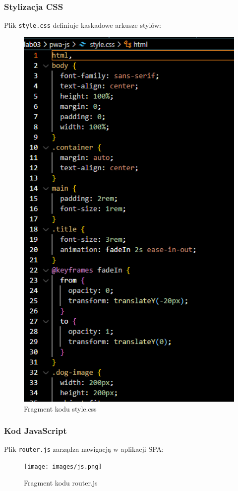 \documentclass[a4paper,12pt]{article}
\begin{document}
\subsubsection{Stylizacja CSS}
Plik \texttt{style.css} definiuje kaskadowe arkusze stylów:

\begin{figure}[H]
    \centering
    \includegraphics[width=1\textwidth]{images/css.png}
    \caption{Fragment kodu style.css}
\end{figure}

\subsubsection{Kod JavaScript}
Plik \texttt{router.js} zarządza nawigacją w aplikacji SPA:

\begin{figure}[H]
    \centering
    \texttt{[image: images/js.png]}
    \caption{Fragment kodu router.js}
\end{figure}
\end{document}
